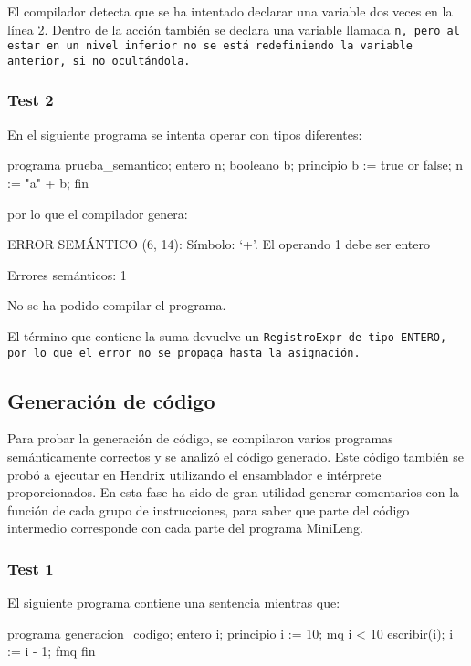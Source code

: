 El compilador detecta que se ha intentado declarar una variable dos veces en la línea 2. Dentro de la acción también se declara una variable llamada \tt{n}, pero al estar en un nivel inferior no se está redefiniendo la variable anterior, si no ocultándola.

\subsubsection{Test 2}
En el siguiente programa se intenta operar con tipos diferentes:

\begin{codigo}[style=minileng,numbers=left]
programa prueba_semantico;
entero n;
booleano b;
principio
    b := true or false;
    n := "a" + b;
fin
\end{codigo}

por lo que el compilador genera:

\begin{codigo}
ERROR SEMÁNTICO (6, 14): Símbolo: `+'. El operando 1 debe ser entero

Errores semánticos: 1

No se ha podido compilar el programa.
\end{codigo}

El término que contiene la suma devuelve un \tt{RegistroExpr} de tipo \tt{ENTERO}, por lo que el error no se propaga hasta la asignación.


\subsection{Generación de código}
Para probar la generación de código, se compilaron varios programas semánticamente correctos y se analizó el código generado. Este código también se probó a ejecutar en Hendrix utilizando el ensamblador e intérprete proporcionados. En esta fase ha sido de gran utilidad generar comentarios con la función de cada grupo de instrucciones, para saber que parte del código intermedio corresponde con cada parte del programa MiniLeng.

\subsubsection{Test 1}
El siguiente programa contiene una sentencia mientras que:

\begin{codigo}[style=minileng,numbers=left]
programa generacion_codigo;
entero i;
principio
    i := 10;
    mq i < 10
        escribir(i);
        i := i - 1;
    fmq
fin
\end{codigo}

